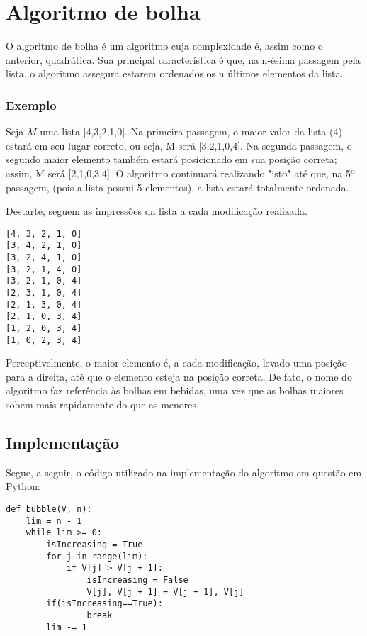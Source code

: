 \section{Algoritmo de bolha}
O algoritmo de bolha é um algoritmo cuja complexidade é, assim como o anterior, quadrática. Sua principal característica é que, na n-ésima passagem pela lista, o algoritmo assegura estarem ordenados os n últimos elementos da lista.

\subsubsection*{Exemplo}
Seja $M$ uma lista [4,3,2,1,0].
Na primeira passagem, o maior valor da lista (4) estará em seu lugar correto, ou seja, M será [3,2,1,0,4]. Na segunda passagem, o segundo maior elemento também estará posicionado em sua posição correta; assim, M será [2,1,0,3,4].
O algoritmo continuará realizando "isto" até que, na 5º passagem, (pois a lista possui 5 elementos), a lista estará totalmente ordenada.

Destarte, seguem as impressões da lista a cada modificação realizada. 

\begin{lstlisting}
[4, 3, 2, 1, 0]
[3, 4, 2, 1, 0]
[3, 2, 4, 1, 0]
[3, 2, 1, 4, 0]
[3, 2, 1, 0, 4]
[2, 3, 1, 0, 4]
[2, 1, 3, 0, 4]
[2, 1, 0, 3, 4]
[1, 2, 0, 3, 4]
[1, 0, 2, 3, 4]
\end{lstlisting}

Perceptivelmente, o maior elemento é, a cada modificação, levado uma posição para a direita, até que o elemento esteja na posição correta. De fato, o nome do algoritmo faz referência às bolhas em bebidas, uma vez que as bolhas maiores sobem mais rapidamente do que as menores.

\newpage
\subsection{Implementação}
Segue, a seguir, o código utilizado na implementação do algoritmo em questão em Python:

\begin{lstlisting}
def bubble(V, n):
    lim = n - 1
    while lim >= 0:
        isIncreasing = True
        for j in range(lim):
            if V[j] > V[j + 1]:
                isIncreasing = False
                V[j], V[j + 1] = V[j + 1], V[j]
        if(isIncreasing==True): 
                break
        lim -= 1
\end{lstlisting}


